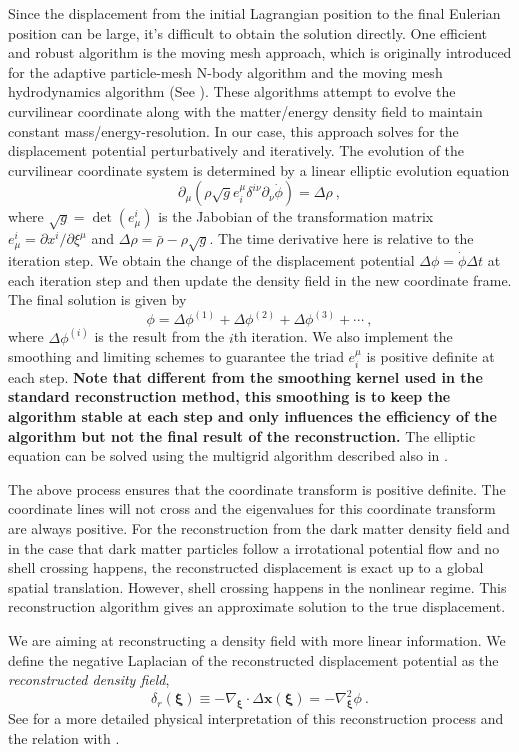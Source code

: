 \documentclass[iop]{emulateapj}
\newcommand{\be}{\begin{equation}}
\newcommand{\ee}{\end{equation}}
\newcommand{\vecx}{{\bm{x}}}
\newcommand{\vecxi}{{\bm{\xi}}}
\begin{document}
{Since the displacement from the initial Lagrangian position to the final Eulerian position can be large,
it's difficult to obtain the solution directly.
One efficient and robust algorithm is the moving mesh approach, which is originally introduced for the adaptive particle-mesh N-body algorithm and the moving mesh hydrodynamics algorithm (See \cite{Pen95,Pen98}).
These algorithms attempt to evolve the curvilinear coordinate along with the matter/energy density field to maintain constant mass/energy-resolution.
In our case, this approach solves for the displacement potential perturbatively and iteratively.
The evolution of the curvilinear coordinate system is determined by a linear elliptic evolution equation
\be
\partial_\mu(\rho\sqrt{g}e^\mu_i\delta^{i\nu}\partial_\nu\dot\phi)=\Delta\rho\ ,
\label{eqn:elliptic}
\ee
where $\sqrt{g}=\det(e^i_\mu)$ is the Jabobian of the transformation matrix $e^i_\mu=\partial x^i/\partial\xi^\mu$ and $\Delta\rho=\bar\rho-\rho\sqrt{g}$.
The time derivative here is relative to the iteration step.
We obtain the change of the displacement potential $\Delta\phi=\dot\phi\Delta t$ at each iteration step and then update the density field in the new coordinate frame.
The final solution is given by 
\be
\phi=\Delta\phi^{(1)}+\Delta\phi^{(2)}+\Delta\phi^{(3)}+\cdots\ ,
\ee
where $\Delta\phi^{(i)}$ is the result from the $i$th iteration.
We also implement the smoothing and limiting schemes to guarantee the triad $e^\mu_i$ is positive definite at each step.
{\bf Note that different from the smoothing kernel used in the standard reconstruction method, this smoothing is to keep the algorithm stable at each step and only influences the efficiency of the algorithm but not the final result of the reconstruction.}
The elliptic equation can be solved using the multigrid algorithm described also in \cite{Pen95}.

The above process ensures that the coordinate transform is positive definite.
The coordinate lines will not cross and the eigenvalues for this coordinate transform are always positive.
For the reconstruction from the dark matter density field and in the case that dark matter particles follow a irrotational potential flow and no shell crossing happens,
 the reconstructed displacement is exact up to a global spatial translation.
However, shell crossing happens in the nonlinear regime.  This reconstruction algorithm gives an approximate solution to the true displacement.

We are aiming at reconstructing a density field with more linear information.
We define the negative Laplacian of the reconstructed displacement potential as the {\it reconstructed density field},
\be
\label{eqn:recon}
\delta_r(\vecxi)\equiv-\nabla_\vecxi\cdot\Delta\vecx(\vecxi)=-\nabla_\vecxi^2\phi\ .
\ee
See \cite{zhuhm16c} for a more detailed physical interpretation of this reconstruction process and the relation with \cite{Eisenstein07}.

}
\end{document}
